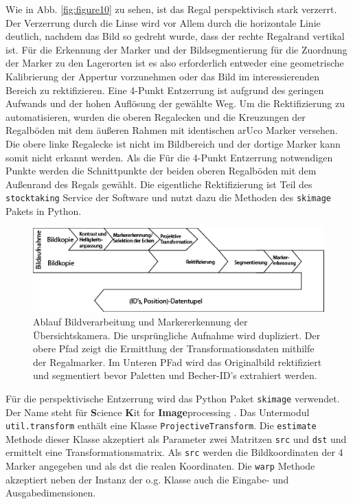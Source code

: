     Wie in Abb. \ref{fig:figure10} zu sehen, ist das Regal perspektivisch stark verzerrt.
    Der Verzerrung durch die Linse wird vor Allem durch die horizontale Linie deutlich, nachdem das Bild so gedreht wurde, dass der rechte Regalrand vertikal ist. 
    Für die Erkennung der Marker und der Bildsegmentierung für die Zuordnung der Marker zu den Lagerorten ist es also erforderlich entweder eine geometrische Kalibrierung der Appertur vorzunehmen oder das Bild im interessierenden Bereich zu rektifizieren. 
    Eine 4-Punkt Entzerrung ist aufgrund des geringen Aufwands und der hohen Auflösung der gewählte Weg. 
    Um die Rektifizierung zu automatisieren, wurden die oberen Regalecken und die Kreuzungen der Regalböden mit dem äußeren Rahmen mit identischen arUco Marker versehen. 
    Die obere linke Regalecke ist nicht im Bildbereich und der dortige Marker kann somit nicht erkannt werden. 
    Als die Für die 4-Punkt Entzerrung notwendigen Punkte werden die Schnittpunkte der beiden oberen Regalböden mit dem Außenrand des Regals gewählt. 
    Die eigentliche Rektifizierung ist Teil des \verb|stocktaking| Service der Software und nutzt dazu die Methoden des \verb|skimage| Pakets in Python.

    \begin{figure}
        \caption[Ablauf Bildverarbeitung und Markererkennung der Übersichtskamera]
        {\small Ablauf Bildverarbeitung und Markererkennung der Übersichtskamera. Die ursprüngliche Aufnahme wird dupliziert. Der obere Pfad zeigt die Ermittlung der Transformationsdaten mithilfe der Regalmarker. Im Unteren PFad wird das Originalbild rektifiziert und segmentiert bevor Paletten und Becher-ID's extrahiert werden.}\label{fig:figure11}
        \includegraphics[width = \textwidth ]{Bilder/AblaufErkennungSellCam.png}
        \centering
    \end{figure}

    Für die perspektivische Entzerrung wird das Python Paket \verb|skimage| verwendet. Der Name steht für \glq \textbf{S}cience \textbf{K}it for \textbf{Image}processing \grq.
    Das Untermodul \verb|util.transform| enthält eine Klasse \verb|ProjectiveTransform|. Die \verb|estimate| Methode dieser Klasse akzeptiert als Parameter zwei Matritzen \verb|src| und \verb|dst| und ermittelt eine Transformationsmatrix.
    Als \verb|src| werden die Bildkoordinaten der 4 Marker angegeben und als dst die \glq realen \grq Koordinaten.
    Die \verb|warp| Methode akzeptiert neben der Instanz der o.g. Klasse auch die Eingabe- und Ausgabedimensionen.     
    
